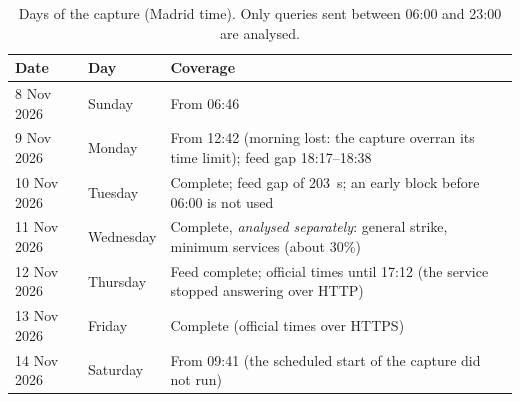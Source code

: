 \begin{table}[t]
\centering
\caption{Days of the capture (Madrid time). Only queries sent between 06:00 and 23:00 are analysed.}
\label{tab:days}
\small
\begin{tabularx}{\linewidth}{llX}
\toprule
Date & Day & Coverage \\
\midrule
8 Nov 2026 & Sunday & From 06:46 \\
9 Nov 2026 & Monday & From 12:42 (morning lost: the capture overran its time limit); feed gap 18:17--18:38 \\
10 Nov 2026 & Tuesday & Complete; feed gap of 203~s; an early block before 06:00 is not used \\
11 Nov 2026 & Wednesday & Complete, \emph{analysed separately}: general strike, minimum services (about 30\%) \\
12 Nov 2026 & Thursday & Feed complete; official times until 17:12 (the service stopped answering over HTTP) \\
13 Nov 2026 & Friday & Complete (official times over HTTPS) \\
14 Nov 2026 & Saturday & From 09:41 (the scheduled start of the capture did not run) \\
\bottomrule
\end{tabularx}
\end{table}
